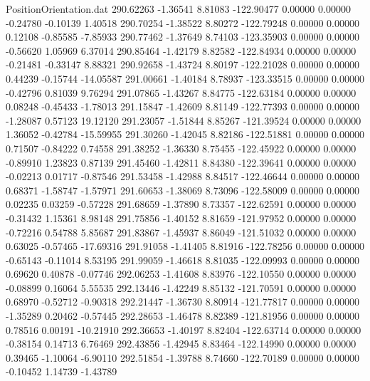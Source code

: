 \begin{filecontents}{PositionOrientation.dat}
 290.62263   -1.36541    8.81083  -122.90477    0.00000    0.00000   -0.24780   -0.10139    1.40518
 290.70254   -1.38522    8.80272  -122.79248    0.00000    0.00000    0.12108   -0.85585   -7.85933
 290.77462   -1.37649    8.74103  -123.35903    0.00000    0.00000   -0.56620    1.05969    6.37014
 290.85464   -1.42179    8.82582  -122.84934    0.00000    0.00000   -0.21481   -0.33147    8.88321
 290.92658   -1.43724    8.80197  -122.21028    0.00000    0.00000    0.44239   -0.15744  -14.05587
 291.00661   -1.40184    8.78937  -123.33515    0.00000    0.00000   -0.42796    0.81039    9.76294
 291.07865   -1.43267    8.84775  -122.63184    0.00000    0.00000    0.08248   -0.45433   -1.78013
 291.15847   -1.42609    8.81149  -122.77393    0.00000    0.00000   -1.28087    0.57123   19.12120
 291.23057   -1.51844    8.85267  -121.39524    0.00000    0.00000    1.36052   -0.42784  -15.59955
 291.30260   -1.42045    8.82186  -122.51881    0.00000    0.00000    0.71507   -0.84222    0.74558
 291.38252   -1.36330    8.75455  -122.45922    0.00000    0.00000   -0.89910    1.23823    0.87139
 291.45460   -1.42811    8.84380  -122.39641    0.00000    0.00000   -0.02213    0.01717   -0.87546
 291.53458   -1.42988    8.84517  -122.46644    0.00000    0.00000    0.68371   -1.58747   -1.57971
 291.60653   -1.38069    8.73096  -122.58009    0.00000    0.00000    0.02235    0.03259   -0.57228
 291.68659   -1.37890    8.73357  -122.62591    0.00000    0.00000   -0.31432    1.15361    8.98148
 291.75856   -1.40152    8.81659  -121.97952    0.00000    0.00000   -0.72216    0.54788    5.85687
 291.83867   -1.45937    8.86049  -121.51032    0.00000    0.00000    0.63025   -0.57465  -17.69316
 291.91058   -1.41405    8.81916  -122.78256    0.00000    0.00000   -0.65143   -0.11014    8.53195
 291.99059   -1.46618    8.81035  -122.09993    0.00000    0.00000    0.69620    0.40878   -0.07746
 292.06253   -1.41608    8.83976  -122.10550    0.00000    0.00000   -0.08899    0.16064    5.55535
 292.13446   -1.42249    8.85132  -121.70591    0.00000    0.00000    0.68970   -0.52712   -0.90318
 292.21447   -1.36730    8.80914  -121.77817    0.00000    0.00000   -1.35289    0.20462   -0.57445
 292.28653   -1.46478    8.82389  -121.81956    0.00000    0.00000    0.78516    0.00191  -10.21910
 292.36653   -1.40197    8.82404  -122.63714    0.00000    0.00000   -0.38154    0.14713    6.76469
 292.43856   -1.42945    8.83464  -122.14990    0.00000    0.00000    0.39465   -1.10064   -6.90110
 292.51854   -1.39788    8.74660  -122.70189    0.00000    0.00000   -0.10452    1.14739   -1.43789

\end{filecontents}
